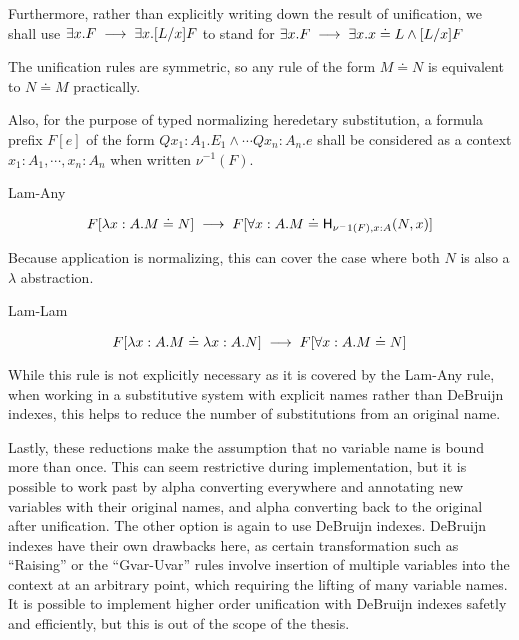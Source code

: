 Furthermore, rather than explicitly writing down the result of unification, 
we shall use $\exists x. F \;\longrightarrow\; \exists x . [ L / x] F$ 
to stand for $\exists x. F \;\longrightarrow\; \exists x . x \doteq L \wedge [ L / x] F$

The unification rules are symmetric, so any rule of the form 
$M \doteq N$ is equivalent to $N \doteq M$ practically.

Also, for the purpose of typed normalizing heredetary substitution, 
a formula prefix $F[e]$ of the form 
$Qx_1:A_1 . E_1\wedge \cdots Qx_n : A_n . e$ shall be considered as a context
$x_1 : A_1 ,\cdots ,x_n : A_n$ when written $\nu^{-1}(F)$.

\setcounter{tcase}{0}

\begin{tcase}
Lam-Any
\end{tcase}

\[
F[\lambda x : A . M \doteq N]
\;\longrightarrow\;
F[\forall x : A . M \doteq \mathsf{H}_{\nu^-1(F),x:A}(N , x)]
\]

Because application is normalizing, this can cover the case where both $N$ is also a $\lambda$ 
abstraction.

\begin{tcase}
Lam-Lam
\end{tcase}

\[
F[\lambda x : A . M \doteq \lambda x : A . N ]
\;\longrightarrow\;
F[ \forall x : A . M \doteq N ]
\]

While this rule is not explicitly necessary as it is covered by the Lam-Any rule, 
when working
in a substitutive system with explicit names rather than DeBruijn indexes, 
this helps to reduce the number of substitutions from an original name. 

Lastly, these reductions make the 
assumption that no variable name is bound more than once.
This can seem restrictive during implementation, but it is possible to 
work past by alpha converting everywhere and annotating
new variables with their original names, and alpha converting
back to the original after unification. The other option is again
to use DeBruijn indexes.  DeBruijn indexes have their own drawbacks
here, as certain transformation such as ``Raising''
or the ``Gvar-Uvar'' rules involve insertion of multiple
variables into the context at an arbitrary point, 
which requiring the lifting of many variable names.  
It is possible to implement higher order unification
with DeBruijn indexes safetly and efficiently, 
but this is out of the scope of the thesis.

